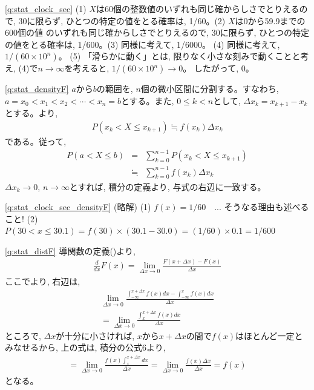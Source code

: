 \ref{q:stat_clock_sec} 
(1) $X$は60個の整数値のいずれも同じ確からしさでとりえるので, 30に限らず, 
ひとつの特定の値をとる確率は, 1/60。(2) $X$は0から59.9までの600個の値
のいずれも同じ確からしさでとりえるので, 30に限らず, ひとつの特定の値をとる確率は, 
1/600。(3) 同様に考えて, 1/6000。 (4) 同様に考えて, $1/(60\times10^n)$。
(5) 「滑らかに動く」とは, 限りなく小さな刻みで動くことと考え, 
(4)で$n\rightarrow\infty$を考えると, $1/(60\times10^n)\rightarrow0$。
したがって, 0。
\mv

\ref{q:stat_densityF}  $a$から$b$の範囲を, $n$個の微小区間に分割する。すなわち, 
$a=x_0<x_1<x_2<\cdots< x_n=b$とする。また, $0\le k< n$として, 
$\Delta x_k=x_{k+1}-x_k$とする。より, 
\begin{eqnarray}P(x_k<X\le x_{k+1})\fallingdotseq f(x_k)\Delta x_k\end{eqnarray}
である。従って, 
\begin{eqnarray}P(a<X\le b)&=&\sum_{k=0}^{n-1}P(x_k<X\le x_{k+1})\nonumber\\
&\fallingdotseq&\sum_{k=0}^{n-1}f(x_k)\Delta x_k\end{eqnarray}
$\Delta x_k\rightarrow 0$, $n\rightarrow \infty$とすれば, 
積分の定義より, 与式の右辺に一致する。
\mv

\ref{q:stat_clock_sec_densityF} (略解) 
(1) $f(x)=1/60$　... そうなる理由も述べること! (2) 
$P(30<x\le30.1)=f(30)\times(30.1-30.0)=(1/60)\times0.1=1/600$
\mv

\ref{q:stat_distF}  導関数の定義()より, 
\begin{eqnarray*}\frac{d}{dx}F(x)=\lim_{\Delta x\rightarrow 0}\frac{F(x+\Delta x)-F(x)}{\Delta x}\end{eqnarray*}
ここでより, 右辺は, 
\begin{eqnarray*}\lim_{\Delta x\rightarrow 0}\frac{\int_{-\infty}^{x+\Delta x}f(x)dx-\int_{-\infty}^{x}f(x)dx}{\Delta x}\\
=\lim_{\Delta x\rightarrow 0}\frac{\int_{x}^{x+\Delta x}f(x)dx}{\Delta x}\end{eqnarray*}
ところで, $\Delta x$が十分に小さければ, $x$から$x+\Delta x$の間で$f(x)$はほとんど一定とみなせるから, 上の式は, 積分の公式6より, 
\begin{eqnarray*}
=\lim_{\Delta x\rightarrow 0}\frac{f(x)\int_{x}^{x+\Delta x}dx}{\Delta x}
=\lim_{\Delta x\rightarrow 0}\frac{f(x)\Delta x}{\Delta x}=f(x)\end{eqnarray*}
となる。
\mv


